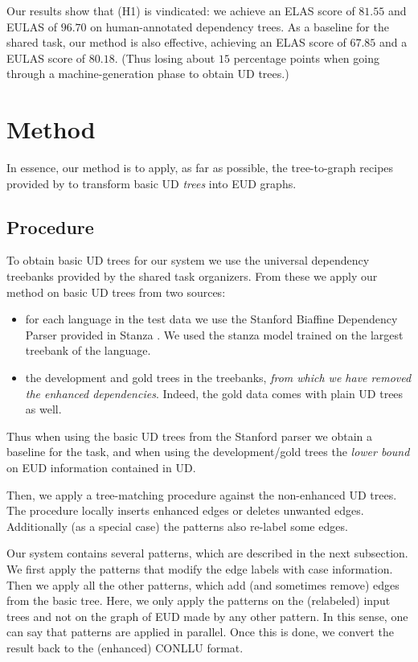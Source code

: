 \documentclass[11pt,a4paper]{article}
\begin{document}
Our results show that (H1) is vindicated: we achieve an ELAS score
of $81.55$ and EULAS of $96.70$ on human-annotated dependency
trees.  As a baseline for the shared task, our method is also
effective, achieving an ELAS score of $67.85$ and a EULAS score
of $80.18$. (Thus losing about $15$ percentage points when going
through a machine-generation phase to obtain UD trees.)

\section{Method}
In essence, our method is to apply, as far as possible, the
tree-to-graph recipes provided by \citet{schuster2016enhanced} to
transform basic UD \emph{trees} into EUD graphs.

\subsection{Procedure} 
To obtain basic UD trees for our system we use the universal
dependency treebanks provided by the shared task organizers. From
these we apply our method on basic UD trees from two sources:

\begin{itemize}
        \item for each language in the test data we use the Stanford
     Biaffine Dependency Parser \citep{dozat2016deep} provided in
     Stanza \citep{qi2020stanza}. We used the stanza model trained on
     the largest treebank of the language.
\item the development and gold trees in the treebanks, \emph{from
      which we have removed the enhanced dependencies}. Indeed, the gold
      data comes with plain UD trees as well.
\end{itemize}

Thus when using the basic UD trees from the Stanford parser we obtain a
baseline for the task, and when using the development/gold trees the
\emph{lower bound} on EUD information contained in UD.

%
Then, we apply a tree-matching procedure against the non-enhanced UD
trees. The procedure locally inserts enhanced edges or deletes unwanted
edges. Additionally (as a special case) the patterns also re-label some edges.


Our system contains several patterns, which are described in the next
subsection. We first apply the patterns that modify
the edge labels with case information. Then we apply all the other
patterns, which add (and sometimes remove) edges from the basic
tree. Here, we only apply the patterns on the (relabeled) input trees
and not on the graph of EUD made by any other pattern. In this sense,
one can say that patterns are applied in parallel.
%
Once this is done, we convert the result back to the
(enhanced) CONLLU format.
\end{document}
